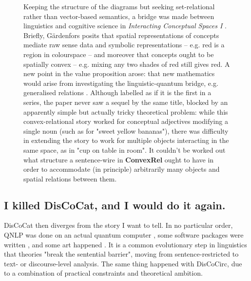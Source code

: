 \begin{figure}[h!]
\centering
{}
\caption{Keeping the structure of the diagrams but seeking set-relational rather than vector-based semantics, a bridge was made between linguistics and cognitive science in \emph{Interacting Conceptual Spaces I} \citep{boltInteractingConceptualSpaces2017b}. Briefly, G\"{a}rdenfors posits \citep{gardenforsGeometryMeaningSemantics2014} that spatial representations of concepts mediate raw sense data and symbolic representations -- e.g. red is a region in colourspace -- and moreover that concepts ought to be spatially convex -- e.g. mixing any two shades of red still gives red. A new point in the value proposition arose: that new mathematics would arise from investigating the linguistic-quantum bridge, e.g. generalised relations \citep{marsdenCustomHypergraphCategories2017}. Although labelled as if it is the first in a series, the paper never saw a sequel by the same title, blocked by an apparently simple but actually tricky theoretical problem: while this convex-relational story worked for conceptual adjectives modifying a single noun (such as for "sweet yellow bananas"), there was difficulty in extending the story to work for multiple objects interacting in the same space, as in "cup on table in room". It couldn't be worked out what structure a sentence-wire in \textbf{ConvexRel} ought to have in order to accommodate (in principle) arbitrarily many objects and spatial relations between them.}
\end{figure}
\clearpage

\subsection{I killed DisCoCat, and I would do it again.}
DisCoCat then diverges from the story I want to tell. In no particular order, QNLP was done on an actual quantum computer \citep{lorenzQNLPPracticeRunning2023}, some software packages were written \citep{kartsaklisLambeq2023}, and some art happened \citep{aquantumcomputerLudovicoQuanthoven}. It is a common evolutionary step in linguistics that theories "break the sentential barrier", moving from sentence-restricted to text- or discourse-level analysis. The same thing happened with DisCoCirc, due to a combination of practical constraints and theoretical ambition.

